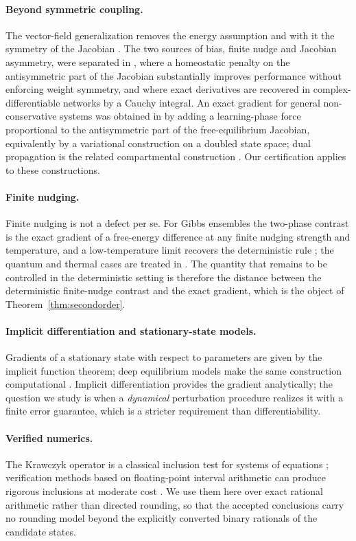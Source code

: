 \documentclass[11pt]{article}
\theoremstyle{definition}
\theoremstyle{remark}
\begin{document}
\paragraph{Beyond symmetric coupling.}
The vector-field generalization removes the energy assumption and with it the symmetry of the
Jacobian \cite{scellier2018}. The two sources of bias, finite nudge and Jacobian asymmetry, were
separated in \cite{laborieux2024}, where a homeostatic penalty on the antisymmetric part of the
Jacobian substantially improves performance without enforcing weight symmetry, and where exact
derivatives are recovered in complex-differentiable networks by a Cauchy integral. An exact
gradient for general non-conservative systems was obtained in \cite{scurria2026} by adding a
learning-phase force proportional to the antisymmetric part of the free-equilibrium Jacobian,
equivalently by a variational construction on a doubled state space; dual propagation is the
related compartmental construction \cite{hoier2023}. Our certification applies to these
constructions.

\paragraph{Finite nudging.}
Finite nudging is not a defect per se. For Gibbs ensembles the two-phase contrast is the exact
gradient of a free-energy difference at any finite nudging strength and temperature, and a
low-temperature limit recovers the deterministic rule \cite{litman2026}; the quantum and thermal
cases are treated in \cite{massar2025}. The quantity that remains to be controlled in the
deterministic setting is therefore the distance between the deterministic finite-nudge contrast
and the exact gradient, which is the object of Theorem~\ref{thm:secondorder}.

\paragraph{Implicit differentiation and stationary-state models.}
Gradients of a stationary state with respect to parameters are given by the implicit function
theorem; deep equilibrium models make the same construction computational
\cite{bai2019,laborieux2024}. Implicit differentiation provides the gradient analytically; the
question we study is when a \emph{dynamical} perturbation procedure realizes it with a finite
error guarantee, which is a stricter requirement than differentiability.

\paragraph{Verified numerics.}
The Krawczyk operator is a classical inclusion test for systems of equations
\cite{krawczyk1969,neumaier1990}; verification methods based on floating-point interval
arithmetic can produce rigorous inclusions at moderate cost \cite{rump2010}. We use them here
over exact rational arithmetic rather than directed rounding, so that the accepted conclusions
carry no rounding model beyond the explicitly converted binary rationals of the candidate states.
\end{document}
